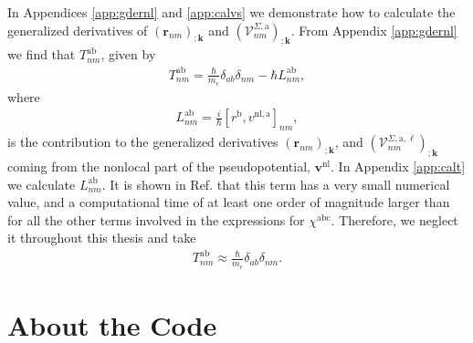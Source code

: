 In Appendices \ref{app:gdernl} and \ref{app:calvs} we demonstrate how to
calculate the generalized derivatives of
$\left(\mathbf{r}_{nm}\right)_{;\mathbf{k}}$ and
$\left(\mathcal{V}^{\Sigma,\mathrm{a}}_{nm}\right)_{;\mathbf{k}}$. From
Appendix \ref{app:gdernl} we find that
$T_{nm}^{\mathrm{ab}}$, given by
\begin{align}\label{tau.1}
T_{nm}^{\mathrm{ab}}
= \frac{\hbar}{m_{e}}\delta_{ab}\delta_{nm}
- \hbar L_{nm}^{\mathrm{ab}},
\end{align}  
where
\begin{align}\label{tau.2}
L_{nm}^{\mathrm{ab}}
= \frac{i}{\hbar}\left[r^{\mathrm{b}},v^{\mathrm{nl},\mathrm{a}}\right]_{nm},
\end{align}
is the contribution to the generalized derivatives
$\left(\mathbf{r}_{nm}\right)_{;\mathbf{k}}$, and
$\left(\mathcal{V}^{\Sigma,\mathrm{a},\ell}_{nm}\right)_{;\mathbf{k}}$ coming
from the nonlocal part of the pseudopotential, $\mathbf{v}^{\mathrm{nl}}$. In
Appendix \ref{app:calt} we calculate $L^{\mathrm{ab}}_{nm}$. It is shown in Ref.
\cite{valerie} that this term has a very small numerical value, and a
computational time of at least one order of magnitude larger than for all the
other terms involved in the expressions for $\chi^{\mathrm{abc}}$. Therefore, we
neglect it throughout this thesis and take
\begin{align}\label{tau.69}
T_{nm}^{\mathrm{ab}} \approx \frac{\hbar}{m_{e}}\delta_{ab}\delta_{nm}.
\end{align} 



\section{About the Code}

